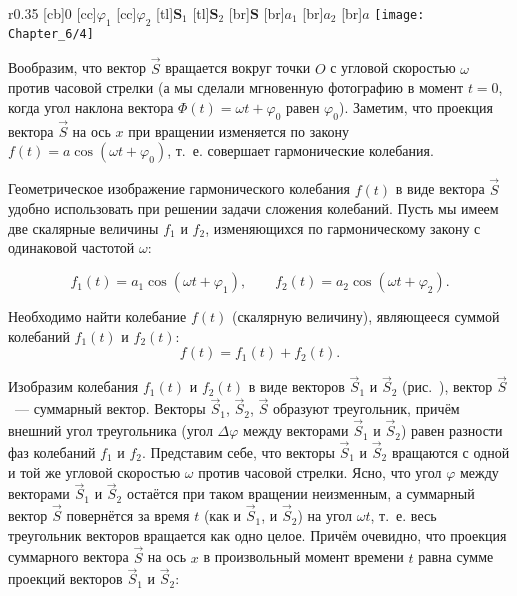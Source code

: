 \begin{wrapfigure}[]{r}{0.35\textwidth}
	[cb]{0}
	[cc]{$\varphi_1$}
	[cc]{$\varphi_2$}
	[tl]{$\mathbf{S}_1$}
	[tl]{$\mathbf{S}_2$}
	[br]{$\mathbf{S}$}
	[br]{$a_1$}
	[br]{$a_2$}
	[br]{$a$}
	\texttt{[image: Chapter\_6/4]}
	\caption{}
\end{wrapfigure}

Вообразим, что вектор $\vec{S}$ вращается вокруг точки $O$ с угловой скоростью $\omega$ против часовой стрелки (а мы
сделали мгновенную фотографию в момент $t=0$, когда угол наклона вектора $\Phi(t)=\omega t + \varphi_0$ равен $\varphi_0$).
Заметим, что проекция вектора $\vec{S}$ на ось $x$ при вращении изменяется по закону $f(t)=a\cos(\omega t+\varphi_0)$, т.~е.
совершает гармонические колебания.

Геометрическое изображение гармонического колебания $f(t)$ в виде вектора $\vec{S}$ удобно использовать при решении задачи
сложения колебаний. Пусть мы имеем две скалярные величины $f_1$ и $f_2$, изменяющихся по гармоническому закону с
одинаковой частотой $\omega$:

\begin{equation*}
	f_1(t)=a_1\cos(\omega t+\varphi_1), \qquad f_2(t)=a_2\cos(\omega t+\varphi_2).
\end{equation*}

Необходимо найти колебание $f(t)$ (скалярную величину), являющееся суммой колебаний $f_1(t)$ и $f_2(t)$:
\begin{equation*}
	f(t)=f_1(t)+f_2(t).
\end{equation*}

Изобразим колебания $f_1(t)$ и $f_2(t)$ в виде векторов $\vec{S}_1$ и $\vec{S}_2$ (рис.~), вектор $\vec{S}$~--- суммарный вектор.
Векторы $\vec{S}_1$, $\vec{S}_2$, $\vec{S}$ образуют треугольник, причём внешний угол треугольника (угол $\Delta\varphi$ между
векторами $\vec{S}_1$ и $\vec{S}_2$) равен разности фаз колебаний $f_1$ и $f_2$. Представим себе, что векторы $\vec{S}_1$ и
$\vec{S}_2$ вращаются с одной и той же угловой скоростью $\omega$ против часовой стрелки. Ясно, что угол $\varphi$ между
векторами $\vec{S}_1$ и $\vec{S}_2$ остаётся при таком вращении неизменным, а суммарный вектор $\vec{S}$ повернётся за время
$t$ (как и $\vec{S}_1$, и $\vec{S}_2$) на угол $\omega t$, т.~е. весь треугольник векторов вращается как одно целое. Причём
очевидно, что проекция суммарного вектора $\vec{S}$ на ось $x$ в произвольный момент времени $t$ равна сумме проекций
векторов $\vec{S}_1$ и $\vec{S}_2$:

